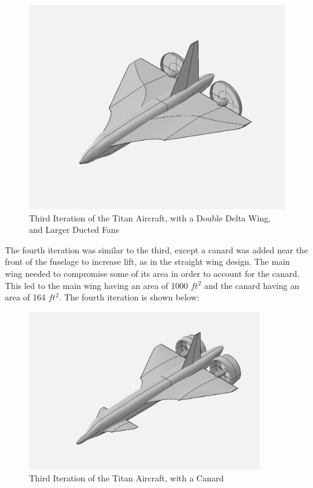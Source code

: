 \documentclass{article}
\begin{document}
 \begin{figure}[H]
 \centering 
    \includegraphics [scale = 0.7]{Figures/TitanLanderv2.png}
    \caption{Third Iteration of the Titan Aircraft, with a Double Delta Wing, and Larger Ducted Fans}
    \label{fig:TitanLanderv2}
\end{figure}

The fourth iteration was similar to the third, except a canard was added near the front of the fuselage to increase lift, as in the straight wing design. The main wing needed to compromise some of its area in order to account for the canard. This led to the main wing having an area of 1000 ${ft^{2}}$ and the canard having an area of 164 ${ft^{2}}$. The fourth iteration is shown below: 

\begin{figure}[H]
    \centering
    \includegraphics[width = 0.90\textwidth]{Figures/TitanLanderv6.png}
    \caption{Third Iteration of the Titan Aircraft, with a Canard}
    \label{fig:TitanLanderv6}
\end{figure}
\end{document}

